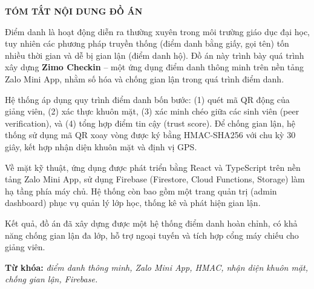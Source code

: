 \documentclass[../main.tex]{subfiles}
\begin{document}
\begin{center}
    {\Large \textbf{TÓM TẮT NỘI DUNG ĐỒ ÁN}}
\end{center}
\vspace{0.5cm}

Điểm danh là hoạt động diễn ra thường xuyên trong môi trường giáo dục đại học, tuy nhiên các phương pháp truyền thống (điểm danh bằng giấy, gọi tên) tốn nhiều thời gian và dễ bị gian lận (điểm danh hộ). Đồ án này trình bày quá trình xây dựng \textbf{Zimo Checkin} -- một ứng dụng điểm danh thông minh trên nền tảng Zalo Mini App, nhằm số hóa và chống gian lận trong quá trình điểm danh.

Hệ thống áp dụng quy trình điểm danh bốn bước: (1) quét mã QR động của giảng viên, (2) xác thực khuôn mặt, (3) xác minh chéo giữa các sinh viên (peer verification), và (4) tổng hợp điểm tin cậy (trust score). Để chống gian lận, hệ thống sử dụng mã QR xoay vòng được ký bằng HMAC-SHA256 với chu kỳ 30 giây, kết hợp nhận diện khuôn mặt và định vị GPS.

Về mặt kỹ thuật, ứng dụng được phát triển bằng React và TypeScript trên nền tảng Zalo Mini App, sử dụng Firebase (Firestore, Cloud Functions, Storage) làm hạ tầng phía máy chủ. Hệ thống còn bao gồm một trang quản trị (admin dashboard) phục vụ quản lý lớp học, thống kê và phát hiện gian lận.

Kết quả, đồ án đã xây dựng được một hệ thống điểm danh hoàn chỉnh, có khả năng chống gian lận đa lớp, hỗ trợ ngoại tuyến và tích hợp cổng máy chiếu cho giảng viên.

\vspace{0.5cm}
\textbf{Từ khóa:} \textit{điểm danh thông minh, Zalo Mini App, HMAC, nhận diện khuôn mặt, chống gian lận, Firebase.}
\end{document}
